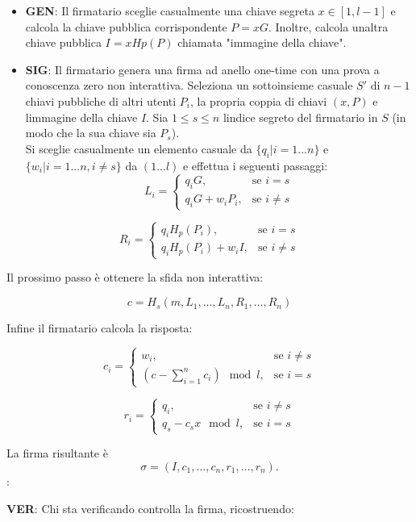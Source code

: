 \begin{itemize}
  \item
    \textbf{GEN}: Il firmatario sceglie casualmente una chiave segreta $x \in
    [1,l-1]$ e calcola la chiave pubblica corrispondente $P=xG$. Inoltre,
    calcola un\textquotesingle altra chiave pubblica $I=xHp(P)$ chiamata
    "immagine della chiave".
  \item
    \textbf{SIG}: Il firmatario genera una firma ad anello one-time con
    una prova a conoscenza zero non interattiva. Seleziona un sottoinsieme
    casuale $S'$ di $n - 1$ chiavi pubbliche di altri utenti $P_i$,
    la propria coppia di chiavi $(x, P)$ e l\textquotesingle immagine della
    chiave $I$. Sia $1 \leq s \leq n$ l\textquotesingle indice segreto del firmatario in
    $S$ (in modo che la sua chiave sia $P_s$).\\
    Si sceglie casualmente un elemento casuale da $\{q_i | i = 1
    ... n\}$ e $\{w_i | i = 1 ... n, i \neq s\}$ da $(1 ... l)$ e effettua
    i seguenti passaggi:
    \[ L_i = \begin{cases} q_iG, & \text{se } i = s \\ q_iG+w_iP_i, & \text{se } i \neq s \end{cases} \]
\end{itemize}

\[ R_i = \begin{cases} q_iH_p(P_i), & \text{se } i = s \\ q_iH_p(P_{i})+ w_iI, & \text{se } i \neq s \end{cases} \]

Il prossimo passo è ottenere la sfida non interattiva:

\[ c = H_s(m, L_1, \ldots, L_n, R_1, \ldots, R_n) \]

Infine il firmatario calcola la risposta:

\[ c_i = \begin{cases} w_i, & \text{se } i \neq s \\ \left(c -\sum_{i=1}^{n} c_i\right) \mod l, & \text{se } i = s \end{cases} \]

\[ r_i = \begin{cases} q_i, & \text{se } i \neq s \\ q_s - c_sx \mod l ,& \text{se } i=s \end{cases} \]

La firma risultante è \[ \sigma= (I,c_1,\ldots,c_n,r_1,\ldots,r_n). \]:

\textbf{VER}: Chi sta verificando controlla la firma, ricostruendo:

